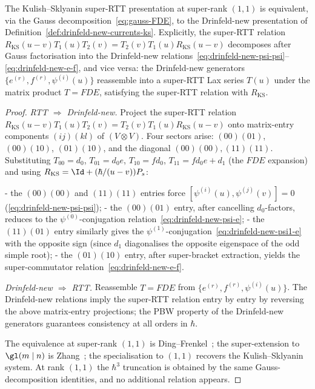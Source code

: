 \begin{theorem}
\label{thm:rtt-drinfeld-new-equivalence}
The Kulish--Sklyanin super-RTT presentation at super-rank $(1,1)$ is
equivalent, via the Gauss decomposition~\eqref{eq:gauss-FDE}, to the
Drinfeld-new presentation of
Definition~\ref{def:drinfeld-new-currents-ks}. Explicitly, the
super-RTT relation $R_{\mathrm{KS}}(u - v) T_1(u) T_2(v) =
T_2(v) T_1(u) R_{\mathrm{KS}}(u - v)$ decomposes after Gauss
factorisation into the Drinfeld-new
relations~\eqref{eq:drinfeld-new-psi-psi}--\eqref{eq:drinfeld-new-e-f},
and vice versa: the Drinfeld-new generators $\{e^{(r)}, f^{(r)},
\psi^{(i)}(u)\}$ reassemble into a super-RTT Lax series $T(u)$ under
the matrix product $T = FDE$, satisfying the super-RTT relation
with $R_{\mathrm{KS}}$.
\end{theorem}

\begin{proof}
\emph{RTT $\Rightarrow$ Drinfeld-new.}
Project the super-RTT relation
$R_{\mathrm{KS}}(u-v) T_1(u) T_2(v) = T_2(v) T_1(u) R_{\mathrm{KS}}(u-v)$
onto matrix-entry components $(ij)(kl)$ of
$(V \otimes V)$. Four sectors arise: $(00)(01)$, $(00)(10)$,
$(01)(10)$, and the diagonal $(00)(00), (11)(11)$. Substituting
$T_{00} = d_0$, $T_{01} = d_0 e$, $T_{10} = f d_0$,
$T_{11} = f d_0 e + d_1$ (the $FDE$ expansion) and using
$R_{\mathrm{KS}} = \Id + (\hbar/(u-v))P_s$:

- the $(00)(00)$ and $(11)(11)$ entries force
$[\psi^{(i)}(u), \psi^{(j)}(v)] = 0$
(\ref{eq:drinfeld-new-psi-psi});
- the $(00)(01)$ entry, after cancelling $d_0$-factors, reduces to
the $\psi^{(0)}$-conjugation relation~\eqref{eq:drinfeld-new-psi-e};
- the $(11)(01)$ entry similarly gives the
$\psi^{(1)}$-conjugation~\eqref{eq:drinfeld-new-psi1-e} with the
opposite sign (since $d_1$ diagonalises the opposite eigenspace of
the odd simple root);
- the $(01)(10)$ entry, after super-bracket extraction, yields
the super-commutator
relation~\eqref{eq:drinfeld-new-e-f}.

\emph{Drinfeld-new $\Rightarrow$ RTT.}
Reassemble $T = FDE$ from $\{e^{(r)}, f^{(r)}, \psi^{(i)}(u)\}$. The
Drinfeld-new relations imply the super-RTT relation entry by entry
by reversing the above matrix-entry projections; the PBW property
of the Drinfeld-new generators guarantees consistency at all orders
in $\hbar$.

The equivalence at super-rank $(1, 1)$ is
Ding--Frenkel~\cite{DingFrenkel1993}; the super-extension to
$\gl(m \mid n)$ is Zhang~\cite{Zhang1995}; the specialisation to
$(1, 1)$ recovers the Kulish--Sklyanin system.
At rank $(1,1)$ the $\hbar^3$ truncation is obtained by the same
Gauss-decomposition identities, and no additional relation appears.
\end{proof}

